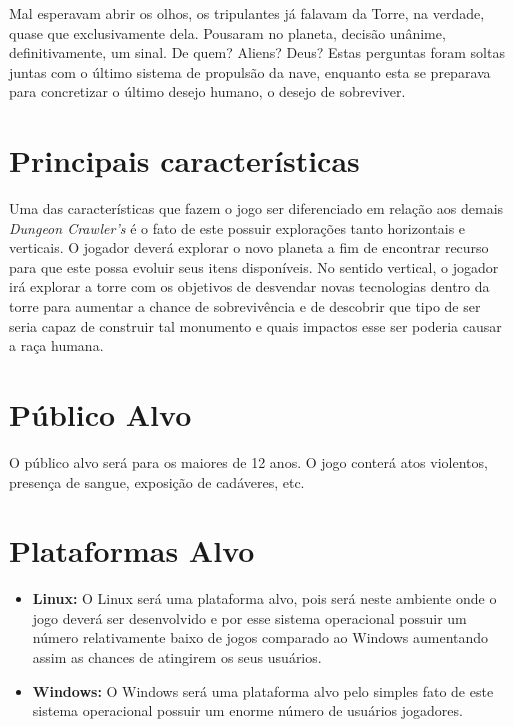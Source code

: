 \documentclass[11pt]{article} %
\begin{document}
Mal esperavam abrir os olhos, os tripulantes já falavam da Torre, na verdade, quase que exclusivamente dela. Pousaram no planeta, decisão unânime, definitivamente, um sinal. De quem? Aliens? Deus? Estas perguntas foram soltas juntas com o último sistema de propulsão da nave, enquanto esta se preparava para concretizar o último desejo humano, o desejo de sobreviver.

\section*{Principais características}

Uma das características que fazem o jogo ser diferenciado em relação aos demais \textit{Dungeon Crawler's} é o fato de este possuir explorações tanto horizontais e verticais. O jogador deverá explorar o novo planeta a fim de encontrar recurso para que este possa evoluir seus itens disponíveis. No sentido vertical, o jogador irá explorar a torre com os objetivos de desvendar novas tecnologias dentro da torre para aumentar a chance de sobrevivência e de descobrir que tipo de ser seria capaz de construir tal monumento e quais impactos esse ser poderia causar a raça humana.

\section*{Público Alvo}

O público alvo será para os maiores de 12 anos. O jogo conterá atos violentos, presença de sangue, exposição de cadáveres, etc.

\section*{Plataformas Alvo}
\begin{itemize}
\item \textbf{Linux:} O Linux será uma plataforma alvo, pois será neste ambiente onde o jogo deverá ser desenvolvido e por esse sistema operacional possuir um número relativamente baixo de jogos comparado ao Windows aumentando assim as chances de atingirem os seus usuários. 

\item \textbf{Windows:} O Windows será uma plataforma alvo pelo simples fato de este sistema operacional possuir um enorme número de usuários jogadores.
\end{itemize}
\end{document}
